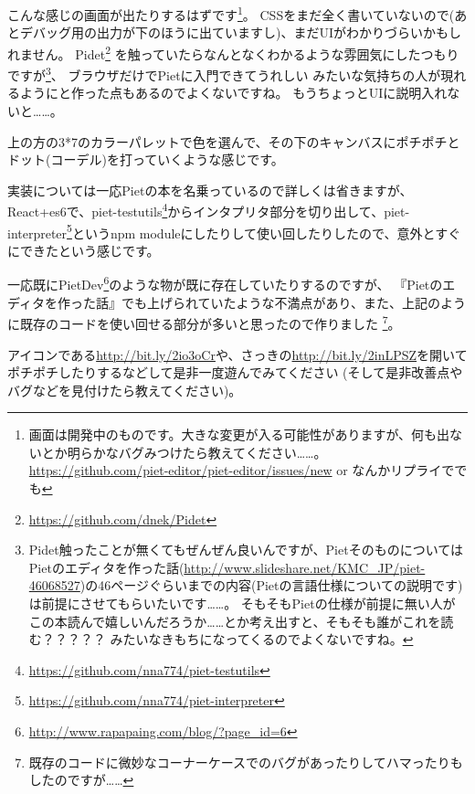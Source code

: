 こんな感じの画面が出たりするはずです\footnote{画面は開発中のものです。大きな変更が入る可能性がありますが、何も出ないとか明らかなバグみつけたら教えてください……。
\url{https://github.com/piet-editor/piet-editor/issues/new} or なんかリプライででも}。
CSSをまだ全く書いていないので(あとデバッグ用の出力が下のほうに出ていますし)、まだUIがわかりづらいかもしれません。
Pidet\footnote{\url{https://github.com/dnek/Pidet}}
を触っていたらなんとなくわかるような雰囲気にしたつもりですが\footnote{Pidet触ったことが無くてもぜんぜん良いんですが、PietそのものについてはPietのエディタを作った話(\url{http://www.slideshare.net/KMC_JP/piet-46068527})の46ページぐらいまでの内容(Pietの言語仕様についての説明です)は前提にさせてもらいたいです……。
そもそもPietの仕様が前提に無い人がこの本読んで嬉しいんだろうか……とか考え出すと、そもそも誰がこれを読む？？？？？ みたいなきもちになってくるのでよくないですね。}、
ブラウザだけでPietに入門できてうれしい みたいな気持ちの人が現れるようにと作った点もあるのでよくないですね。
もうちょっとUIに説明入れないと……。

上の方の3*7のカラーパレットで色を選んで、その下のキャンバスにポチポチとドット(コーデル)を打っていくような感じです。

実装については一応Pietの本を名乗っているので詳しくは省きますが、React+es6で、piet-testutils\footnote{\url{https://github.com/nna774/piet-testutils}}からインタプリタ部分を切り出して、piet-interpreter\footnote{\url{https://github.com/nna774/piet-interpreter}}というnpm moduleにしたりして使い回したりしたので、意外とすぐにできたという感じです。

一応既にPietDev\footnote{\url{http://www.rapapaing.com/blog/?page_id=6}}のような物が既に存在していたりするのですが、
『Pietのエディタを作った話』でも上げられていたような不満点があり、また、上記のように既存のコードを使い回せる部分が多いと思ったので作りました
\footnote{既存のコードに微妙なコーナーケースでのバグがあったりしてハマったりもしたのですが……}。

アイコンである\url{http://bit.ly/2io3oCr}や、さっきの\url{http://bit.ly/2inLPSZ}を開いてポチポチしたりするなどして是非一度遊んでみてください
(そして是非改善点やバグなどを見付けたら教えてください)。
